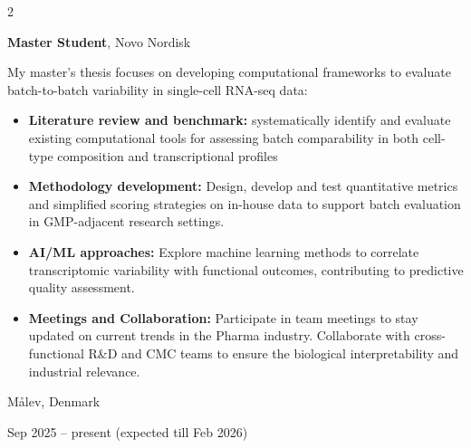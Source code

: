 \documentclass[10pt, letterpaper]{article}
\newenvironment{highlights}{
    \begin{itemize}[
        topsep=0.10 cm,
        parsep=0.10 cm,
        partopsep=0pt,
        itemsep=0pt,
        leftmargin=0.4 cm + 10pt
    ]
}{
    \end{itemize}
} %
\newenvironment{twocolentry}[2][]{
    \onecolentry
    \def\secondColumn{#2}
    \setcolumnwidth{\fill, 4.5 cm}
    \begin{paracol}{2}
}{
    \switchcolumn \raggedleft \secondColumn
    \end{paracol}
    \endonecolentry
} %
\begin{document}
        \begin{twocolentry}{
    Målev, Denmark

    Sep 2025 – present (expected till Feb 2026)
}
    \textbf{Master Student}, Novo Nordisk

    \vspace{0.1cm}
    
     My master’s thesis focuses on developing computational frameworks to evaluate batch-to-batch variability in single-cell RNA-seq data:

    \begin{highlights}
        \item \textbf{Literature review and benchmark:} systematically identify and evaluate existing computational tools for assessing batch comparability in both cell-type composition and transcriptional profiles

        \vspace{0.1cm}

        \item \textbf{Methodology development:} Design, develop and test quantitative metrics and simplified scoring strategies on in-house data to support batch evaluation in GMP-adjacent research settings.

        \vspace{0.1cm}

        \item \textbf{AI/ML approaches:} Explore machine learning methods to correlate transcriptomic variability with functional outcomes, contributing to predictive quality assessment.

        \vspace{0.1cm}

        \item \textbf{Meetings and Collaboration:} Participate in team meetings to stay updated on current trends in the Pharma industry. Collaborate with cross-functional R\&D and CMC teams to ensure the biological interpretability and industrial relevance.
    \end{highlights}
\end{twocolentry}


        \vspace{0.3 cm}
\end{document}
